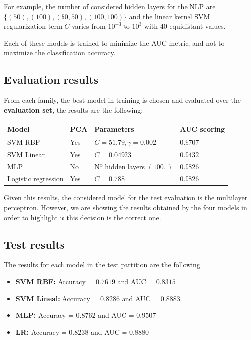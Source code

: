 \documentclass[11pt]{article}
\begin{document}
For example, the number of considered hidden layers for the NLP are \( \{(50), (100), (50, 50), (100, 100)\} \) and the linear kernel SVM regularization term \( C \) varies from \( 10^{-3} \) to \( 10^{3} \) with 40 equidistant values.

Each of these models is trained to minimize the AUC metric, and not to maximize the classification accuracy.

\subsection*{Evaluation results}

From each family, the best model in training is chosen and evaluated over the \textbf{evaluation set}, the results are the following:

\begin{table}[H]
  \centering
  \begin{tabular}{llll}
    \textbf{Model}      & \textbf{PCA} & \textbf{Parameters} & \textbf{AUC scoring} \\ \hline
    SVM RBF             & Yes &      \( C = 51.79, \gamma = 0.002\)  &     \( 0.9707 \)       \\
    SVM Linear          & Yes &   \(  C = 0.04923 \)   &   \( 0.9432 \)   \\
    MLP                 & No  &  Nº hidden layers \( (100,) \)     &    \(  0.9826 \)          \\
    Logistic regression & Yes & \( C = 0.788 \) &    \( 0.9826 \)        
    \end{tabular}
  \end{table}

Given this results, the considered model for the test evaluation is the multilayer perceptron. However, we are showing the results obtained by the four models in order to highlight is this decision is the correct one.

\subsection*{Test results}

The results for each model in the test partition are the following

\begin{itemize}
  \item \textbf{SVM RBF: } Accuracy = \( 0.7619 \) and AUC = \( 0.8315 \) 
  \item \textbf{SVM Lineal: } Accuracy = \( 0.8286 \) and AUC = \( 0.8883 \) 
  \item \textbf{MLP: }Accuracy = \( 0.8762 \) and AUC = \( 0.9507 \) 
  \item \textbf{LR: }Accuracy = \( 0.8238 \) and AUC = \( 0.8880 \) 
\end{itemize}
\end{document}
